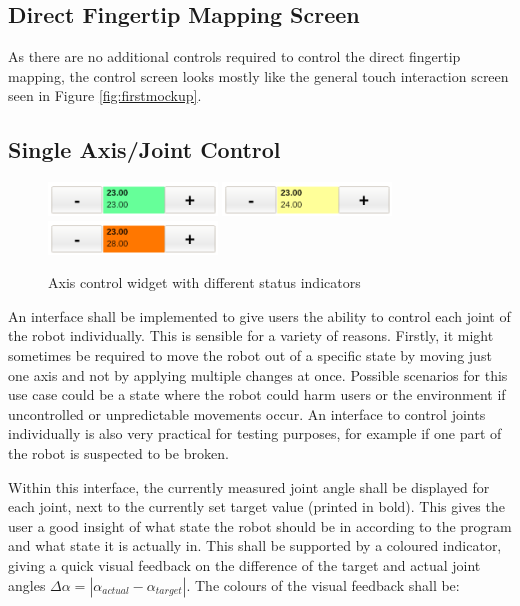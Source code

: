 \subsection{Direct Fingertip Mapping Screen}

As there are no additional controls required to control the direct fingertip mapping, the control screen looks mostly like the general touch interaction screen seen in Figure \ref{fig:firstmockup}.

\subsection{Single Axis/Joint Control}

\begin{figure}
	\caption{\label{fig:axiscontrol}Axis control widget with different status indicators}
	\includegraphics[width=0.4\textwidth]{assets/chpt_concepts/AxisControlGreen}
	\includegraphics[width=0.4\textwidth]{assets/chpt_concepts/AxisControlYellow}
	\includegraphics[width=0.4\textwidth]{assets/chpt_concepts/AxisControlRed}
\end{figure}

An interface shall be implemented to give users the ability to control each joint of the robot individually. This is sensible for a variety of reasons. Firstly, it might sometimes be required to move the robot out of a specific state by moving just one axis and not by applying multiple changes at once. Possible scenarios for this use case could be a state where the robot could harm users or the environment if uncontrolled or unpredictable movements occur. An interface to control joints individually is also very practical for testing purposes, for example if one part of the robot is suspected to be broken.

Within this interface, the currently measured joint angle shall be displayed for each joint, next to the currently set target value (printed in bold). This gives the user a good insight of what state the robot should be in according to the program and what state it is actually in. This shall be supported by a coloured indicator, giving a quick visual feedback on the difference of the target and actual joint angles $\Delta \alpha = |\alpha_{actual} - \alpha_{target}|$. The colours of the visual feedback shall be:

